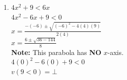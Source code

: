 \begin{example}
\begin{enumerate}
    \begin{center}
    \end{center}
    $(x + 5)(x - 4)  0$ \\
    $x = -5 \land x = 4$ \\
    $(-\infty, -5) \cup (4, \infty)$ \\
    $(0)^2 + (0) - 20 > 0$ \\
    $v(-20 > 0) = \bot$
  \item $4x^2 + 9 < 6x$ \\
    $4x^2 - 6x + 9 < 0$ \\
    $x = \frac{-(-6) \pm \sqrt{(-6)^2 - 4(4)(9)}}{2(4)}$ \\
    $x = \frac{6 \pm \sqrt{36 - 144}}{8}$ \\
    \textbf{Note: }This parabola has \textbf{NO} $x$-axis. \\
    $4(0)^2 - 6(0) + 9 < 0$ \\
    $v(9 < 0) = \bot$
  \end{enumerate}
\end{example}
